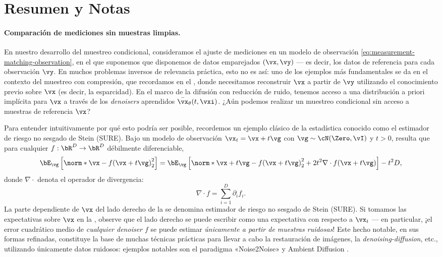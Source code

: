 \documentclass[../../book-main_es.tex]{subfiles}
\begin{document}
\section{Resumen y Notas}
\paragraph{Comparación de mediciones sin muestras limpias.} En nuestro desarrollo del
muestreo condicional, consideramos el ajuste de mediciones en un modelo de observación
\eqref{eq:measurement-matching-observation}, en el que suponemos que disponemos de
datos emparejados $(\vx, \vy)$ --- es decir, los datos de referencia para cada observación $\vy$.
En muchos problemas inversos de relevancia práctica, esto no es así: uno de los
ejemplos más fundamentales se da en el contexto del muestreo con compresión, que
recordamos en el , donde necesitamos reconstruir
$\vx$ a partir de $\vy$
utilizando el conocimiento previo sobre $\vx$ (es decir, la esparcidad).
En el marco de la difusión con reducción de ruido, tenemos acceso a una distribución a priori implícita para
$\vx$ a través de los \textit{denoisers} aprendidos $\bar{\vx}_{\theta}(t, \vxi)$. ¿Aún podemos
realizar un muestreo condicional sin acceso a muestras de referencia $\vx$?

Para entender intuitivamente por qué esto podría ser posible, recordemos un ejemplo clásico
de la estadística conocido como el estimador de riesgo no sesgado de Stein (SURE).
Bajo un modelo de observación $\vx_t = \vx + t \vg$ con $\vg \sim \cN(\Zero,
\vI)$ y $t>0$, resulta que para cualquier $f :
\bR^D \to \bR^D$ débilmente diferenciable,
\begin{equation}\label{eq:sure-risk}
    \bE_{\vg}\left[
        \norm*{\vx - f(\vx + t \vg)}_2^2
    \right]
    =
    \bE_{\vg}\left[
        \norm*{\vx+t\vg - f(\vx + t \vg)}_2^2
        + 2t^2 \nabla \cdot f(\vx + t\vg)
    \right]
    - t^2 D,
\end{equation}
donde $\nabla \cdot$ denota el operador de divergencia:
\begin{equation*}
    \nabla \cdot f = \sum_{i=1}^D \partial_i f_i.
\end{equation*}
La parte dependiente de $\vx$ del lado derecho de la  se denomina
estimador de riesgo no sesgado de Stein
(SURE). Si tomamos las expectativas sobre $\vx$ en la ,
observe que el lado derecho se puede escribir como una expectativa con respecto a $\vx_t$ --- en
particular, ¡el error cuadrático medio de \textit{cualquier denoiser $f$} se puede estimar
\textit{únicamente a partir de muestras ruidosas}!
Este hecho notable, en sus formas refinadas, constituye la base de muchas técnicas prácticas
para llevar a cabo la restauración de imágenes, la \textit{denoising-diffusion}, etc., utilizando
únicamente datos ruidosos: ejemplos notables son el paradigma «Noise2Noise»
\cite{pmlr-v80-lehtinen18a}
y Ambient Diffusion \cite{daras2023ambient}.
\end{document}
